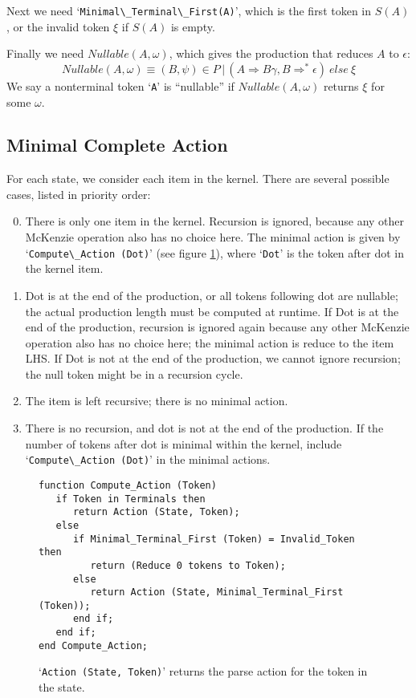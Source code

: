 \documentclass{article}
\newcommand{\code}[1]{`\lstinline|#1|'}
\begin{document}
Next we need \code{Minimal\_Terminal\_First(A)}, which is the first
token in $S(A)$, or the invalid token $\xi$ if $S(A)$ is empty.

Finally we need $Nullable(A, \omega)$, which gives the production that
reduces $A$ to $\epsilon$:
\begin{equation}
Nullable(A, \omega) \equiv (B, \psi) \in P\, |\, (A \Rightarrow B \gamma, B \Rightarrow^* \epsilon)\ else\ \xi
\end{equation}
We say a nonterminal token \code{A} is ``nullable'' if
$Nullable(A, \omega)$ returns $\xi$ for some $\omega$.
\subsection{Minimal Complete Action}
For each state, we consider each item in the kernel. There are
several possible cases, listed in priority order:
\begin{enumerate}
  \setcounter{enumi}{-1}

\item There is only one item in the kernel. Recursion is ignored,
  because any other McKenzie operation also has no choice here. The
  minimal action is given by \code{Compute\_Action (Dot)} (see figure
  \ref{code:compute_action}), where \code{Dot} is the token after dot
  in the kernel item.

\item Dot is at the end of the production, or all tokens following dot
  are nullable; the actual production length must be computed at
  runtime. If Dot is at the end of the production, recursion is
  ignored again because any other McKenzie operation also has no
  choice here; the minimal action is reduce to the item LHS. If Dot is
  not at the end of the production, we cannot ignore recursion; the
  null token might be in a recursion cycle.

\item The item is left recursive; there is no minimal action.

\item There is no recursion, and dot is not at the end of the
  production. If the number of tokens after dot is minimal within the
  kernel, include \code{Compute\_Action (Dot)} in the minimal actions.

\end{enumerate}

\begin{figure}[H]
\begin{lstlisting}
function Compute_Action (Token)
   if Token in Terminals then
      return Action (State, Token);
   else
      if Minimal_Terminal_First (Token) = Invalid_Token then
         return (Reduce 0 tokens to Token);
      else
         return Action (State, Minimal_Terminal_First (Token));
      end if;
   end if;
end Compute_Action;
\end{lstlisting}

\code{Action (State, Token)} returns the parse action for
the token in the state.

\caption{}
\label{code:compute_action}
\end{figure}
\end{document}

